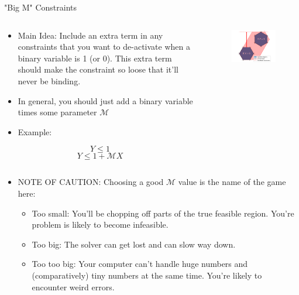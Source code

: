 \documentclass[10pt, aspectratio=169]{beamer}
\begin{document}
\begin{frame}{"Big M" Constraints}
    \vspace{-0.4cm}
    \begin{columns}
        \begin{column}{0.5\textwidth}
            \begin{itemize}
                \item Main Idea: Include an extra term in any constraints that you want to de-activate when a binary variable is 1 (or 0). This extra term should make the constraint so loose that it'll never be binding.
                \item In general, you should just add a binary variable times some  parameter $\mathcal{M}$
                \item Example:
            \end{itemize}
            $$Y \leq 1$$
            $$Y \leq 1 + \mathcal{M} X$$
        \end{column}
        \begin{column}{0.5\textwidth}
            \begin{figure}
                \includegraphics[width=\linewidth]{ExpandedBigM.png}
            \end{figure}
        \end{column}
    \end{columns}
    \begin{itemize}
        \item NOTE OF CAUTION: Choosing a good $\mathcal{M}$ value is the name of the game here:
        \begin{itemize}
            \item Too small: You'll be chopping off parts of the true feasible region. You're problem is likely to become infeasible.
            \item Too big: The solver can get lost and can slow way down.
            \item Too too big: Your computer can't handle huge numbers and (comparatively) tiny numbers at the same time. You're likely to encounter weird errors.
        \end{itemize}
    \end{itemize}
\end{frame}
\end{document}
